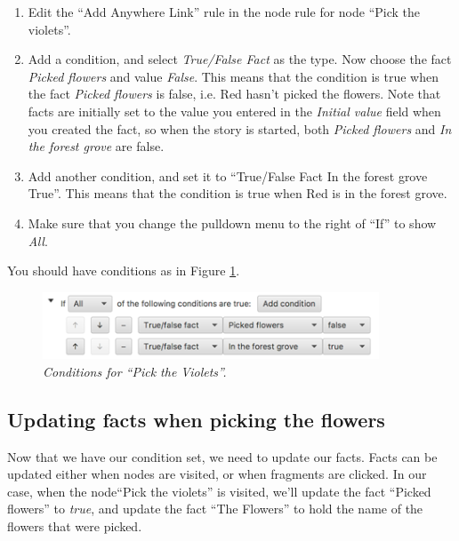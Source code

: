 \documentclass{article}
\begin{document}
\begin{enumerate}
  \item Edit the ``Add Anywhere Link'' rule in the node rule for node ``Pick the violets''.
  \item Add a condition, and select \textit{True/False Fact} as the type. Now choose the fact \textit{Picked flowers} and value \textit{False}. This means that the condition is true when the fact \textit{Picked flowers} is false, i.e. Red hasn't picked the flowers. Note that facts are initially set to the value you entered in the \textit{Initial value} field when you created the fact, so when the story is started, both \textit{Picked flowers} and \textit{In the forest grove} are false.
  \item Add another condition, and set it to ``True/False Fact In the forest grove True''. This means that the condition is true when Red is in the forest grove.
  \item Make sure that you change the pulldown menu to the right of ``If'' to show \textit{All}.
\end{enumerate}

You should have conditions as in Figure \ref{fig:tut3:picktheviolets}.

\begin{figure}[h]
  \centering
  \includegraphics[width=10cm]{images/hypedyn-tutorial-3-figure-10}
  \caption{\textit{Conditions for ``Pick the Violets''.}}
  \label{fig:tut3:picktheviolets}
\end{figure}

\subsection{Updating facts when picking the flowers}

Now that we have our condition set, we need to update our facts. Facts can be updated either when nodes are visited, or when fragments are clicked. In our case, when the node``Pick the violets'' is visited, we'll update the fact ``Picked flowers'' to \textit{true}, and update the fact ``The Flowers'' to hold the name of the flowers that were picked.
\end{document}
